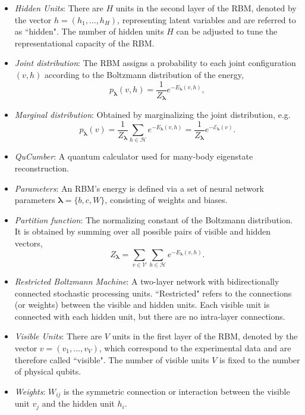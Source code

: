 \documentclass[submission, Phys]{SciPost}
\begin{document}
\begin{itemize}
	\item {\it Hidden Units}: There are $H$ units in the second layer of the RBM, denoted by the vector $h=(h_1, ..., h_H)$, representing latent variables and are referred to as ``hidden". The number of hidden units $H$ can be adjusted to tune the representational capacity of the RBM.

	\item {\it Joint distribution}: The RBM assigns a probability to each joint configuration $(v,h)$ according to the Boltzmann distribution of the energy,
	      \begin{equation}
		      p_{\bm{\lambda}}(v,h) = \frac{1}{Z_{\bm{\lambda}}} e^{-E_{\bm{\lambda}}(v,h)},
	      \end{equation}

	\item {\it Marginal distribution}: Obtained by marginalizing the joint distribution, e.g.
	      \begin{equation}
		      \label{Eq:marginal_distribution}
		      p_{\bm{\lambda}}(v) = \frac{1}{Z_{\bm{\lambda}}} \sum\limits_{h\in \mathcal{H}} e^{-E_{\bm{\lambda}}(v,h)} = \frac{1}{Z_{\bm{\lambda}}} e^{- \mathcal{E}_{\bm{\lambda}}(v)}.
	      \end{equation}

	\item {\it QuCumber}: A quantum calculator used for many-body eigenstate reconstruction.

	\item {\it Parameters}: An RBM's energy is defined via a set of neural network parameters $\bm{\lambda} = \{b,c,W\}$, consisting of weights and biases.

	\item {\it Partition function}: The normalizing constant of the Boltzmann distribution. It is obtained by summing over all possible pairs of visible and hidden vectors,
	      \begin{equation}
		      Z_{\bm{\lambda}} = \sum\limits_{v\in \mathcal{V}}\sum\limits_{h\in \mathcal{H}} e^{-E_{\bm{\lambda}}(v,h)}.
	      \end{equation}

	\item {\it Restricted Boltzmann Machine}: A two-layer network with bidirectionally connected stochastic processing units. ``Restricted" refers to the connections (or weights) between the visible and hidden units. Each visible unit is connected with each hidden unit, but there are no intra-layer connections.

	\item {\it Visible Units}: There are $V$ units in the first layer of the RBM, denoted by the vector $v=(v_1, ..., v_V)$, which correspond to the experimental data and are therefore called ``visible". The number of visible units $V$ is fixed to the number of physical qubits.

	\item {\it Weights}: $W_{ij}$ is the symmetric connection or interaction between the visible unit $v_j$ and the hidden unit $h_i$.

\end{itemize}
\end{document}
